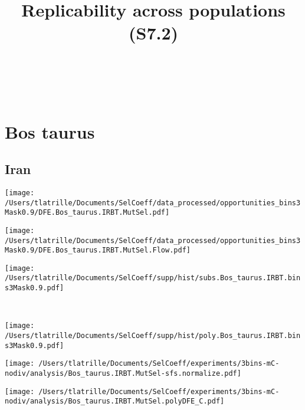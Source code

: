 \documentclass{article}
\title{Replicability across populations (S7.2)}
\date{~}
\author{~}
\begin{document}
    \maketitle
    \tableofcontents
    \newpage

    \section{Bos taurus}

    \subsection{Iran}

    \begin{minipage}{0.32\linewidth}
        \texttt{[image: /Users/tlatrille/Documents/SelCoeff/data\_processed/opportunities\_bins3Mask0.9/DFE.Bos\_taurus.IRBT.MutSel.pdf]}
    \end{minipage}
    \begin{minipage}{0.32\linewidth}
        \texttt{[image: /Users/tlatrille/Documents/SelCoeff/data\_processed/opportunities\_bins3Mask0.9/DFE.Bos\_taurus.IRBT.MutSel.Flow.pdf]}
    \end{minipage}
    \begin{minipage}{0.32\linewidth}
        \texttt{[image: /Users/tlatrille/Documents/SelCoeff/supp/hist/subs.Bos\_taurus.IRBT.bins3Mask0.9.pdf]}
    \end{minipage}
    \\
    \begin{minipage}{0.32\linewidth}
        \texttt{[image: /Users/tlatrille/Documents/SelCoeff/supp/hist/poly.Bos\_taurus.IRBT.bins3Mask0.9.pdf]}
    \end{minipage}
    \begin{minipage}{0.32\linewidth}
        \texttt{[image: /Users/tlatrille/Documents/SelCoeff/experiments/3bins-mC-nodiv/analysis/Bos\_taurus.IRBT.MutSel-sfs.normalize.pdf]}
    \end{minipage}
    \begin{minipage}{0.32\linewidth}
        \texttt{[image: /Users/tlatrille/Documents/SelCoeff/experiments/3bins-mC-nodiv/analysis/Bos\_taurus.IRBT.MutSel.polyDFE\_C.pdf]}
    \end{minipage}
\end{document}
